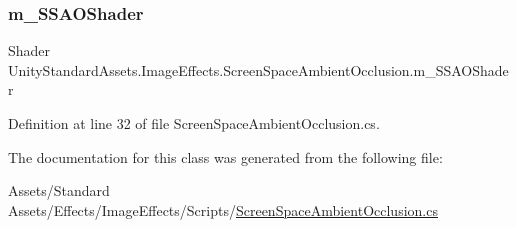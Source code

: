 \subsubsection{\texorpdfstring{m\+\_\+\+S\+S\+A\+O\+Shader}{m\_SSAOShader}}
{\footnotesize\ttfamily Shader Unity\+Standard\+Assets.\+Image\+Effects.\+Screen\+Space\+Ambient\+Occlusion.\+m\+\_\+\+S\+S\+A\+O\+Shader}



Definition at line 32 of file Screen\+Space\+Ambient\+Occlusion.\+cs.



The documentation for this class was generated from the following file\+:\begin{DoxyCompactItemize}
\item 
Assets/\+Standard Assets/\+Effects/\+Image\+Effects/\+Scripts/\mbox{\hyperlink{_screen_space_ambient_occlusion_8cs}{Screen\+Space\+Ambient\+Occlusion.\+cs}}\end{DoxyCompactItemize}
